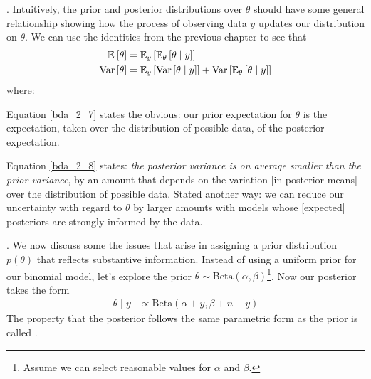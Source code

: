 \documentclass[11pt]{article}
\begin{document}
\p {}. Intuitively, the prior and posterior distributions over $\theta$ should have some general relationship showing how the process of observing data $y$ updates our distribution on $\theta$. We can use the identities from the previous chapter to see that 
\begin{align}
	\E{\theta} &= \E[y]{\E[\theta]{\theta \mid y}} \label{bda_2_7} \\
	\Var{\theta} &= \E[y]{\Var{\theta \mid y}} + \Var{ \E[\theta]{\theta \mid y} } \label{bda_2_8}
\end{align}
where:
\begin{compactitem}[$\rightarrow$]
	\item Equation \ref{bda_2_7} states the obvious: our prior expectation for $\theta$ is the expectation, taken over the distribution of possible data, of the posterior expectation. 
	\item Equation \ref{bda_2_8} states: \textit{the posterior variance is on average smaller than the prior variance}, by an amount that depends on the variation [in posterior means] over the distribution of possible data. Stated another way: we can reduce our uncertainty with regard to $\theta$ by larger amounts with models whose [expected] posteriors are strongly informed by the data. 
\end{compactitem}


\p {}. We now discuss some the issues that arise in assigning a prior distribution $p(\theta)$ that reflects substantive information. Instead of using a uniform prior for our binomial model, let's explore the prior $\theta \sim \text{Beta}(\alpha, \beta)$\footnote{Assume we can select reasonable values for $\alpha$ and $\beta$.}. Now our posterior takes the form
\begin{align}
	\theta \mid y &\propto \text{Beta}(\alpha + y, \beta + n - y)
\end{align}
The property that the posterior follows the same parametric form as the prior is called . 
\end{document}
